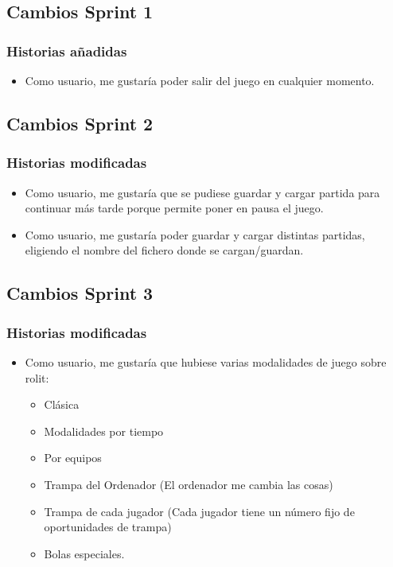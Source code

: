 \documentclass[../../FINAL/Scrum/SCRUM.tex]{subfiles}
\begin{document}
\subsection{Cambios Sprint 1}
\subsubsection*{Historias añadidas}
\begin{itemize}
\item
  Como usuario, me gustaría poder salir del juego en cualquier momento.
\end{itemize}

\subsection{Cambios Sprint 2}
\subsubsection*{Historias modificadas}
\begin{itemize}
\item
   Como usuario, me gustaría que se pudiese guardar y
  cargar partida para continuar más tarde porque permite poner en pausa
  el juego.{}
\item
  Como usuario, me gustaría poder guardar y cargar distintas partidas,
  eligiendo el nombre del fichero donde se cargan/guardan.
\end{itemize}

\subsection{Cambios Sprint 3}
\subsubsection*{Historias modificadas}

\begin{itemize}
\item
  Como usuario, me gustaría que hubiese varias modalidades de juego
  sobre rolit:

  \begin{itemize}
  \item
    Clásica
  \item
     Modalidades por tiempo{}
  \item
    Por equipos
  \item
     Trampa del Ordenador (El ordenador me cambia las
    cosas)
  \item
     Trampa de cada jugador (Cada jugador tiene un número
    fijo de oportunidades de trampa)
  \item
     Bolas especiales.
  \end{itemize}
\end{itemize}
\end{document}
